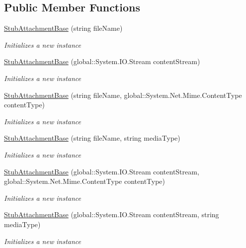 \subsection*{Public Member Functions}
\begin{DoxyCompactItemize}
\item 
\hyperlink{class_system_1_1_net_1_1_mail_1_1_fakes_1_1_stub_attachment_base_a42588b9779d246fa9a1312c0ce5c9384}{Stub\-Attachment\-Base} (string file\-Name)
\begin{DoxyCompactList}\small\item\em Initializes a new instance\end{DoxyCompactList}\item 
\hyperlink{class_system_1_1_net_1_1_mail_1_1_fakes_1_1_stub_attachment_base_a9d12fa203fd91b684252696e69d8e8bd}{Stub\-Attachment\-Base} (global\-::\-System.\-I\-O.\-Stream content\-Stream)
\begin{DoxyCompactList}\small\item\em Initializes a new instance\end{DoxyCompactList}\item 
\hyperlink{class_system_1_1_net_1_1_mail_1_1_fakes_1_1_stub_attachment_base_a2398e9a432f0929edddbe0dc1cb83327}{Stub\-Attachment\-Base} (string file\-Name, global\-::\-System.\-Net.\-Mime.\-Content\-Type content\-Type)
\begin{DoxyCompactList}\small\item\em Initializes a new instance\end{DoxyCompactList}\item 
\hyperlink{class_system_1_1_net_1_1_mail_1_1_fakes_1_1_stub_attachment_base_ade731488f16f43884a2ad0dac9edc224}{Stub\-Attachment\-Base} (string file\-Name, string media\-Type)
\begin{DoxyCompactList}\small\item\em Initializes a new instance\end{DoxyCompactList}\item 
\hyperlink{class_system_1_1_net_1_1_mail_1_1_fakes_1_1_stub_attachment_base_a399d87d7c0a900661d5f8b299535dd86}{Stub\-Attachment\-Base} (global\-::\-System.\-I\-O.\-Stream content\-Stream, global\-::\-System.\-Net.\-Mime.\-Content\-Type content\-Type)
\begin{DoxyCompactList}\small\item\em Initializes a new instance\end{DoxyCompactList}\item 
\hyperlink{class_system_1_1_net_1_1_mail_1_1_fakes_1_1_stub_attachment_base_a530ef77adf06b02fee5a81ff13c6eb92}{Stub\-Attachment\-Base} (global\-::\-System.\-I\-O.\-Stream content\-Stream, string media\-Type)
\begin{DoxyCompactList}\small\item\em Initializes a new instance\end{DoxyCompactList}\end{DoxyCompactItemize}

